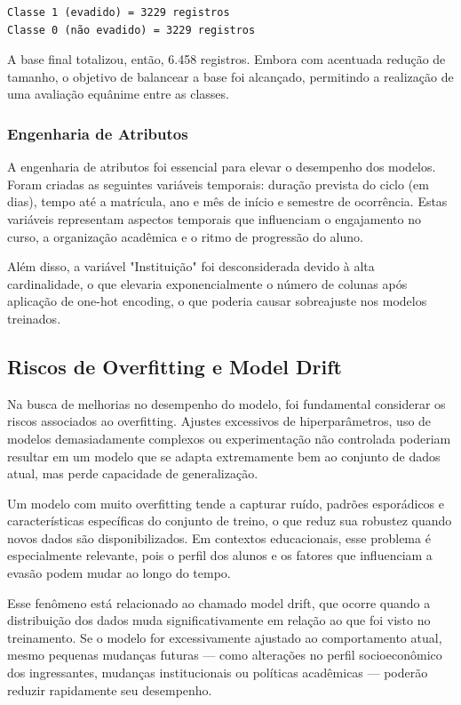 \documentclass[english, spanish, brazilian]{RBIEarticle} %
\begin{document}
\begin{verbatim}
Classe 1 (evadido) = 3229 registros
Classe 0 (não evadido) = 3229 registros
\end{verbatim}

A base final totalizou, então, 6.458 registros. Embora com acentuada redução de tamanho, o objetivo de balancear a base foi alcançado, permitindo a realização de uma avaliação equânime entre as classes.

\subsubsection{Engenharia de Atributos}
A engenharia de atributos foi essencial para elevar o desempenho dos modelos. Foram criadas as seguintes variáveis temporais: duração prevista do ciclo (em dias), tempo até a matrícula, ano e mês de início e semestre de ocorrência. Estas variáveis representam aspectos temporais que influenciam o engajamento no curso, a organização acadêmica e o ritmo de progressão do aluno.

Além disso, a variável "Instituição" foi desconsiderada devido à alta cardinalidade, o que elevaria exponencialmente o número de colunas após aplicação de one-hot encoding, o que poderia causar sobreajuste nos modelos treinados.

\subsection{Riscos de Overfitting e Model Drift}

Na busca de melhorias no desempenho do modelo, foi fundamental considerar os riscos associados ao overfitting. Ajustes excessivos de hiperparâmetros, uso de modelos demasiadamente complexos ou experimentação não controlada poderiam resultar em um modelo que se adapta extremamente bem ao conjunto de dados atual, mas perde capacidade de generalização.

Um modelo com muito overfitting tende a capturar ruído, padrões esporádicos e características específicas do conjunto de treino, o que reduz sua robustez quando novos dados são disponibilizados. Em contextos educacionais, esse problema é especialmente relevante, pois o perfil dos alunos e os fatores que influenciam a evasão podem mudar ao longo do tempo.

Esse fenômeno está relacionado ao chamado model drift, que ocorre quando a distribuição dos dados muda significativamente em relação ao que foi visto no treinamento. Se o modelo for excessivamente ajustado ao comportamento atual, mesmo pequenas mudanças futuras — como alterações no perfil socioeconômico dos ingressantes, mudanças institucionais ou políticas acadêmicas — poderão reduzir rapidamente seu desempenho.
\end{document}
